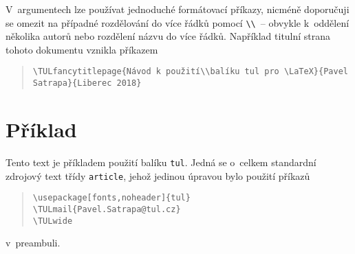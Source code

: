 \documentclass[a4paper,12pt,twoside]{article}
\newcommand{\cmdfont}[1]{\texttt{\color{\tulcolor}#1}}
\newcommand{\cmdnoindex}[1]{\cmdfont{\textbackslash #1}}
\begin{document}
V~argumentech lze používat jednoduché formátovací příkazy, nicméně
doporučuji se omezit na případné rozdělování do více řádků pomocí
\cmdnoindex{\textbackslash}~-- obvykle k~oddělení několika autorů nebo rozdělení
názvu do více řádků. Například titulní strana tohoto dokumentu vznikla
příkazem

\begin{quote}\begin{flushleft}
\cmdnoindex{TULfancytitlepage\{Návod k~použití\textbackslash\textbackslash balíku tul
pro \textbackslash LaTeX\}\{Pavel Satrapa\}\{Liberec 2018\}}
\end{flushleft}\end{quote}


\section{Příklad}

Tento text je příkladem použití balíku \cmdfont{tul}. Jedná se o~celkem
standardní zdrojový text třídy \cmdfont{article}, jehož jedinou úpravou bylo
použití příkazů

\begin{quote}
\cmdnoindex{usepackage[fonts,noheader]\{tul\}}\\
\cmdnoindex{TULmail\{Pavel.Satrapa@tul.cz\}}\\
\cmdnoindex{TULwide}
\end{quote}

v~preambuli.


\renewcommand{\indexname}{Přehled příkazů}
\printindex
\end{document}
